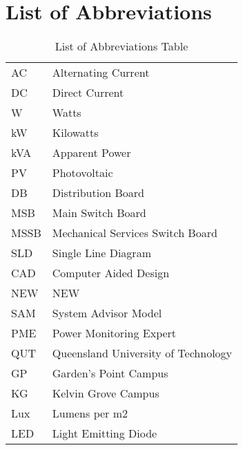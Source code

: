 
\section{List of Abbreviations}

\begin{table}[H]
	\centering
	\begin{tabular}{p{8cm}p{8cm}}
		AC   & Alternating Current              \\
		DC   & Direct Current                   \\
		W    & Watts                            \\
		kW   & Kilowatts                        \\
		kVA  & Apparent Power                   \\
		PV   & Photovoltaic                     \\
		DB   & Distribution Board               \\
		MSB  & Main Switch Board                \\
		MSSB & Mechanical Services Switch Board \\
		SLD  & Single Line Diagram              \\
		CAD  & Computer Aided Design            \\
		NEW  & NEW                   			\\
		SAM  & System Advisor Model    			\\
		PME  & Power Monitoring Expert          \\
		QUT  & Queensland University of Technology       \\
		GP   & Garden's Point Campus            \\
		KG   & Kelvin Grove Campus              \\
		Lux  & Lumens per m2                    \\
		LED  & Light Emitting Diode            
	\end{tabular}
	\caption{List of Abbreviations Table}
	\label{table:abbreviations}
\end{table}